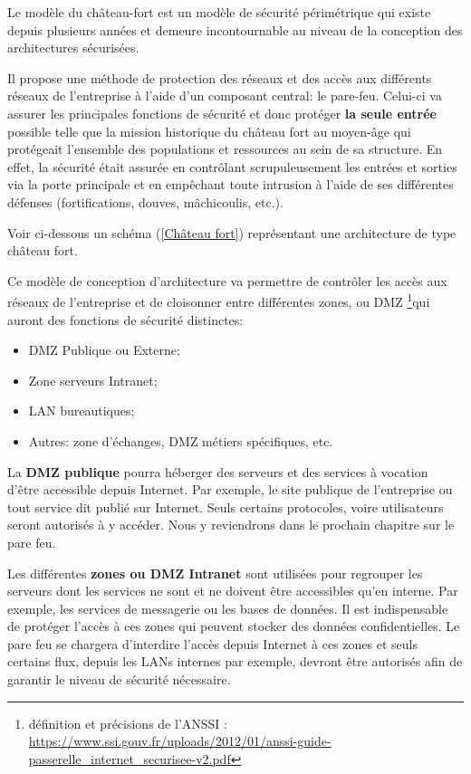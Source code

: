 Le modèle du château-fort est un modèle de sécurité périmétrique qui existe depuis plusieurs années et demeure incontournable au niveau de la conception des architectures sécurisées. 

Il propose une méthode de protection des réseaux et des accès aux différents réseaux de l'entreprise à l'aide d'un composant central: le pare-feu. Celui-ci va assurer les principales fonctions de sécurité et donc protéger \textbf{la seule entrée} possible telle que la mission historique du château fort au moyen-âge qui protégeait l'ensemble des populations et ressources au sein de sa structure. En effet, la sécurité était assurée en contrôlant scrupuleusement les entrées et sorties via la porte principale et en empêchant toute intrusion à l'aide de ses différentes défenses (fortifications, douves, mâchicoulis, etc.).

Voir ci-dessous un schéma (\ref{Château fort}) représentant une architecture de type château fort.

Ce modèle de conception d'architecture va permettre de contrôler les accès aux réseaux de l'entreprise et de cloisonner entre différentes zones, ou DMZ \footnote{définition et précisions de l'ANSSI : \url{https://www.ssi.gouv.fr/uploads/2012/01/anssi-guide-passerelle_internet_securisee-v2.pdf}}qui auront des fonctions de sécurité distinctes:
\begin{itemize}
    \item DMZ Publique ou Externe;
    \item Zone serveurs Intranet;
    \item LAN bureautiques;
    \item Autres: zone d'échanges, DMZ métiers spécifiques, etc.
\end{itemize}

La \textbf{DMZ publique} pourra héberger des serveurs et des services à vocation d'être accessible depuis Internet. Par exemple, le site publique de l'entreprise ou tout service dit publié sur Internet. Seuls certains protocoles, voire utilisateurs seront autorisés à y accéder. Nous y reviendrons dans le prochain chapitre sur le pare feu.

Les différentes \textbf{zones ou DMZ Intranet} sont utilisées pour regrouper les serveurs dont les services ne sont et ne doivent être accessibles qu'en interne. Par exemple, les services de messagerie ou les bases de données. Il est indispensable de protéger l'accès à ces zones qui peuvent stocker des données confidentielles. Le pare feu se chargera d'interdire l'accès depuis Internet à ces zones et seuls certains flux, depuis les LANs internes par exemple, devront être autorisés afin de garantir le niveau de sécurité nécessaire.

